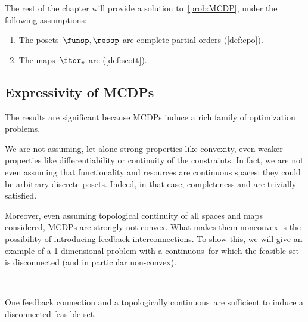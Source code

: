 The rest of the chapter will provide a solution to~\cref{prob:MCDP},
under the following assumptions:

\begin{enumerate}
    \item The posets~$\funsp,\ressp$ are complete partial orders (\cref{def:cpo}).
    \item The maps~$\ftor_v$ are \scottcontinuous (\cref{def:scott}).
\end{enumerate}

\subsection{Expressivity of MCDPs}
The results are significant because MCDPs induce a rich family of optimization problems.

We are not assuming, let alone strong properties like convexity, even weaker properties like differentiability or continuity of the constraints.
In fact, we are not even assuming that functionality and resources are continuous spaces; they could be arbitrary discrete posets.
Indeed, in that case, completeness and \scottcontinuity are trivially satisfied.


Moreover, even assuming topological continuity of all spaces and maps considered, MCDPs are strongly not convex.
What makes them nonconvex is the possibility of introducing feedback interconnections.
To show this, we will give an example of a 1-dimensional problem with a continuous~\ftor for which the feasible set is disconnected (and in particular non-convex).

\begin{marginfigure}
    \centering
     \\
    \caption{One feedback connection and a topologically continuous~\ftor are sufficient to induce a disconnected feasible set.}
    \label{fig:ceil-1}
\end{marginfigure}

